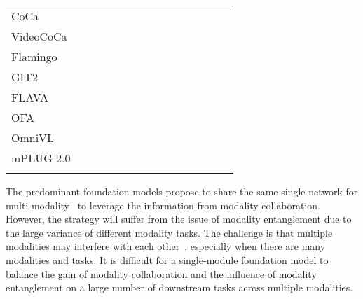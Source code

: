\documentclass{article}
\theoremstyle{plain}
\theoremstyle{definition}
\theoremstyle{remark}
\newlength\savewidth
\newcommand\shline{\noalign{\global\savewidth\arrayrulewidth\global\arrayrulewidth 1pt}\hline\noalign{\global\arrayrulewidth\savewidth}}
\begin{document}
\begin{table*}[t!]
{\begin{tabular}{l|cccc|ccc|cccc|ccc}
    CoCa      &           &           &      &      &                             &    &               &           &    &            &  &           &     &             \\
    VideoCoCa &            &           &      &      &                             &    &               &            &     &             &    &        &     &             \\
    Flamingo  &            &           &      &      &                             &    &               &           &    &     &        &            &    &            \\
    GIT2      &           &            &      &      &                            &    &               &            &    &            &  &           &    &            \\
    FLAVA     &           &            &      &      &                            &   &              &            &    &             &            &     &    &          \\
    OFA       &           &            &      &      &                            &   &              &           &    &    &         &            &     &             \\
    OmniVL    &           &           &      &      &                             &    &               &           &    &  &           &           &    &            \\
    \hline 
    mPLUG 2.0 &           &           &     &     &                            &   &               &           &    &     &        &           &    &         \\ 
    \shline
    \end{tabular}
    }
    \label{table:support-tasks}
    \vspace{-2ex}
\end{table*} 
The predominant foundation models propose to share the same single network for multi-modality~\citep{Alayrac2022FlamingoAV} to leverage the information from modality collaboration. However, the strategy will suffer from the issue of modality entanglement due to the large variance of different modality tasks.
The challenge is that multiple modalities may interfere with each other~\citep{huang2022modality}, especially when there are many modalities and tasks. It is difficult for a single-module foundation model to balance the gain of modality collaboration and the influence of modality entanglement on a large number of downstream tasks across multiple modalities. 
\end{document}

